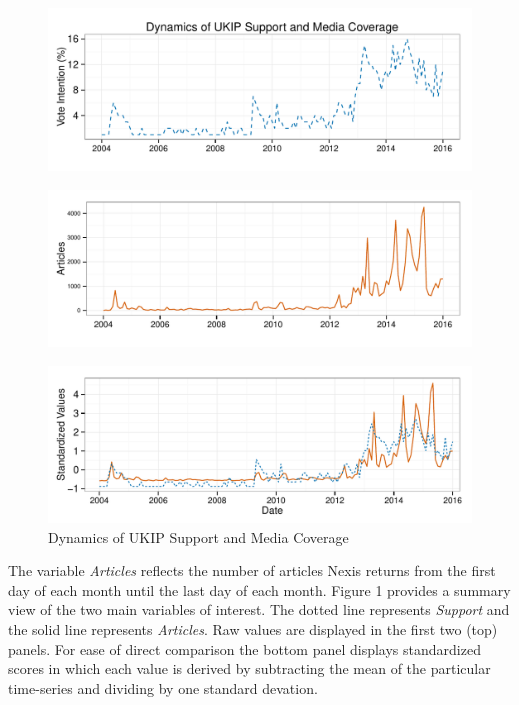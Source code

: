 \documentclass[12pt,article]{article}
\begin{document}
\setlength\parindent{0pt}

\begin{figure}[htbp]
\centering
\includegraphics{ukip_media_files/figure-latex/unnamed-chunk-1-1.pdf}
\caption{}
\end{figure}

\begin{figure}[htbp]
\centering
\includegraphics{ukip_media_files/figure-latex/unnamed-chunk-2-1.pdf}
\caption{}
\end{figure}

\begin{figure}[htbp]
\centering
\includegraphics{ukip_media_files/figure-latex/unnamed-chunk-3-1.pdf}
\caption{Dynamics of UKIP Support and Media Coverage}
\end{figure}

\setlength\parindent{24pt}

The variable \emph{Articles} reflects the number of articles Nexis
returns from the first day of each month until the last day of each
month. Figure 1 provides a summary view of the two main variables of
interest. The dotted line represents \emph{Support} and the solid line
represents \emph{Articles}. Raw values are displayed in the first two
(top) panels. For ease of direct comparison the bottom panel displays
standardized scores in which each value is derived by subtracting the
mean of the particular time-series and dividing by one standard
devation.
\end{document}
